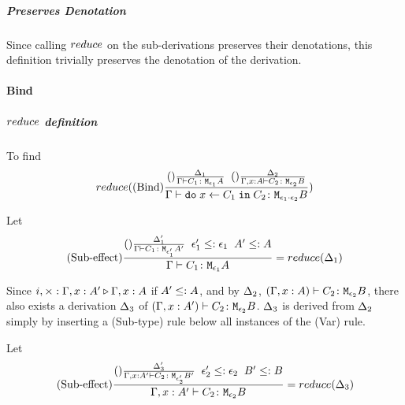 {            \subparagraph{Preserves Denotation}
                Since calling $reduce{}$ on the sub-derivations preserves their denotations, this definition trivially preserves the denotation of the derivation.


                \paragraph{Bind}
                \subparagraph{$reduce$ definition}

                To find
                \begin{equation}
                    reduce(
                        (\text{Bind}) \frac{
                            (\text{}) \frac{
                                \Delta_1
                            }{
                                \Gamma \vdash C_1 \colon \texttt{M}_{\epsilon_1}{A}
                            }
                            \;\;
                            (\text{}) \frac{
                                \Delta_2
                            }{
                                \Gamma, x: A \vdash C_2 \colon \texttt{M}_{\epsilon_2}{B}
                            }
                        }{
                            \Gamma \vdash \texttt{do}\; x \leftarrow C_1 \;\texttt{in}\; C_2 \colon \texttt{M}_{\epsilon_1\cdot\epsilon_2}{B}
                        }
                    )
                \end{equation}


                Let \begin{equation}
                    (\text{Sub-effect}) \frac{
                        (\text{}) \frac{\Delta'_1}{\Gamma \vdash C_1 \colon \texttt{M}_{\epsilon'_1}{A'}}
                    \;\;
                    \epsilon_1' \leq: \epsilon_1
                    \;\;
                    A' \leq: A
                    }{
                        \Gamma \vdash C_1 \colon \texttt{M}_{\epsilon_1}{A}
                    } = reduce(\Delta_1)
                \end{equation}

                Since $i,\times : \Gamma, x: A' \triangleright \Gamma, x: A$ if $A' \leq: A$, and by $\Delta_2$, $(\Gamma, x: A) \vdash C_2 \colon \texttt{M}_{\epsilon_2}{B}$, there also exists a derivation $\Delta_3$ of $(\Gamma, x: A') \vdash C_2 \colon \texttt{M}_{\epsilon_2}{B}$. $\Delta_3$ is derived from $\Delta_2$ simply by inserting a (Sub-type) rule below all instances of the (Var) rule.

                Let \begin{equation}
                    (\text{Sub-effect}) \frac{
                        (\text{}) \frac{\Delta'_3}{\Gamma, x: A' \vdash C_2 \colon \texttt{M}_{\epsilon'_2}{B'}}
                    \;\;
                    \epsilon_2' \leq: \epsilon_2
                    \;\;
                    B' \leq: B
                    }{
                        \Gamma, x: A' \vdash C_2 \colon \texttt{M}_{\epsilon_2}{B}
                    } = reduce(\Delta_3)
                \end{equation}
                

}
